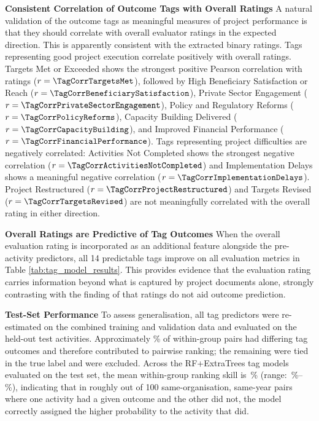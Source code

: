 \textbf{Consistent Correlation of Outcome Tags with Overall Ratings} A natural validation of the outcome tags as meaningful measures of project performance is that they should correlate with overall evaluator ratings in the expected direction. This is apparently consistent with the extracted binary ratings. Tags representing good project execution correlate positively with overall ratings. Targets Met or Exceeded shows the strongest positive Pearson correlation with ratings ($r = \TagCorrTargetsMet$), followed by High Beneficiary Satisfaction or Reach ($r = \TagCorrBeneficiarySatisfaction$), Private Sector Engagement ($r = \TagCorrPrivateSectorEngagement$), Policy and Regulatory Reforms ($r = \TagCorrPolicyReforms$), Capacity Building Delivered ($r = \TagCorrCapacityBuilding$), and Improved Financial Performance ($r = \TagCorrFinancialPerformance$). Tags representing project difficulties are negatively correlated: Activities Not Completed shows the strongest negative correlation ($r = \TagCorrActivitiesNotCompleted$) and Implementation Delays shows a meaningful negative correlation ($r = \TagCorrImplementationDelays$). Project Restructured ($r = \TagCorrProjectRestructured$) and Targets Revised ($r = \TagCorrTargetsRevised$) are not meaningfully correlated with the overall rating in either direction. 

\textbf{Overall Ratings are Predictive of Tag Outcomes} When the overall evaluation rating is incorporated as an additional feature alongside the pre-activity predictors, all 14 predictable tags improve on all evaluation metrics in Table \ref{tab:tag_model_results}. This provides evidence that the evaluation rating carries information beyond what is captured by project documents alone, strongly contrasting with the finding of \citep{goldembergMindingGapAid2025} that ratings do not aid outcome prediction.


\textbf{Test-Set Performance} To assess generalisation, all tag predictors were re-estimated on the combined training and validation data and evaluated on the held-out test activities. Approximately \DifferingOutcomePairsFrac\% of within-group pairs had differing tag outcomes and therefore contributed to pairwise ranking; the remaining were tied in the true label and were excluded. Across the \NumCuratedPredicted{} RF+ExtraTrees tag models evaluated on the test set, the mean within-group ranking skill is \OutcomeTagPairwiseAvg\,\% (range: \OutcomeTagPairwiseMin\,\%--\OutcomeTagPairwiseMax\,\%), indicating that in roughly \OutcomeTagPairwiseAvg{} out of 100 same-organisation, same-year pairs where one activity had a given outcome and the other did not, the model correctly assigned the higher probability to the activity that did.

